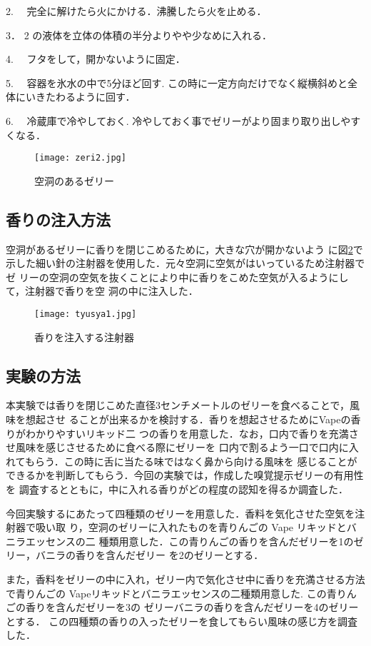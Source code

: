 2. 　完全に解けたら火にかける．沸騰したら火を止める．


3． 2 の液体を立体の体積の半分よりやや少なめに入れる．


4. 　フタをして，開かないように固定．


5. 　容器を氷水の中で5分ほど回す. この時に一定方向だけでなく縦横斜めと全体にいきたわるように回す．


6. 　冷蔵庫で冷やしておく. 冷やしておく事でゼリーがより固まり取り出しやすくなる．


  \begin{figure}[t]
    \centering
    \texttt{[image: zeri2.jpg]}
    \caption{空洞のあるゼリー}
    \label{zeri}
  \end{figure}


\subsection{香りの注入方法}
  空洞があるゼリーに香りを閉じこめるために，大きな穴が開かないよう
に図\ref{tyusya}で示した細い針の注射器を使用した．元々空洞に空気がはいっているため注射器でゼ
リーの空洞の空気を抜くことにより中に香りをこめた空気が入るようにして，注射器で香りを空
洞の中に注入した．

\begin{figure}[t]
  \centering
  \texttt{[image: tyusya1.jpg]}
  \caption{香りを注入する注射器}
  \label{tyusya}
\end{figure}


\subsection{実験の方法}

本実験では香りを閉じこめた直径3センチメートルのゼリーを食べることで，風味を想起させ
ることが出来るかを検討する．香りを想起させるためにVapeの香りがわかりやすいリキッド二
つの香りを用意した．なお，口内で香りを充満させ風味を感じさせるために食べる際にゼリーを
口内で割るよう一口で口内に入れてもらう．この時に舌に当たる味ではなく鼻から向ける風味を
感じることができるかを判断してもらう．今回の実験では，作成した嗅覚提示ゼリーの有用性を
調査するとともに，中に入れる香りがどの程度の認知を得るか調査した．


今回実験するにあたって四種類のゼリーを用意した．香料を気化させた空気を注射器で吸い取
り，空洞のゼリーに入れたものを青りんごの Vape リキッドとバニラエッセンスの二
種類用意した．この青りんごの香りを含んだゼリーを1のゼリー，バニラの香りを含んだゼリー
を2のゼリーとする．


また，香料をゼリーの中に入れ，ゼリー内で気化させ中に香りを充満させる方法で青りんごの
Vapeリキッドとバニラエッセンスの二種類用意した. この青りんごの香りを含んだゼリーを3の
ゼリーバニラの香りを含んだゼリーを4のゼリーとする．
この四種類の香りの入ったゼリーを食してもらい風味の感じ方を調査した．